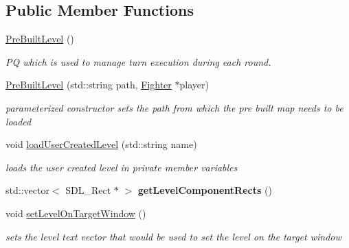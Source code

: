 \subsection*{Public Member Functions}
\begin{DoxyCompactItemize}
\item 
\hyperlink{class_pre_built_level_a86e618ddeb7a0ca8484f268dc927819d}{Pre\+Built\+Level} ()
\begin{DoxyCompactList}\small\item\em PQ which is used to manage turn execution during each round. \end{DoxyCompactList}\item 
\hypertarget{class_pre_built_level_abf37d637c8cea3dfa78adc4ee066a8be}{}\label{class_pre_built_level_abf37d637c8cea3dfa78adc4ee066a8be} 
\hyperlink{class_pre_built_level_abf37d637c8cea3dfa78adc4ee066a8be}{Pre\+Built\+Level} (std\+::string path, \hyperlink{class_fighter}{Fighter} $\ast$player)
\begin{DoxyCompactList}\small\item\em parameterized constructor sets the path from which the pre built map needs to be loaded \end{DoxyCompactList}\item 
\hypertarget{class_pre_built_level_aab6e5f41f2e67cb0c2af129dae067560}{}\label{class_pre_built_level_aab6e5f41f2e67cb0c2af129dae067560} 
void \hyperlink{class_pre_built_level_aab6e5f41f2e67cb0c2af129dae067560}{load\+User\+Created\+Level} (std\+::string name)
\begin{DoxyCompactList}\small\item\em loads the user created level in private member variables \end{DoxyCompactList}\item 
\hypertarget{class_pre_built_level_af3fec0bf964834a5330187d6b5696fee}{}\label{class_pre_built_level_af3fec0bf964834a5330187d6b5696fee} 
std\+::vector$<$ S\+D\+L\+\_\+\+Rect $\ast$ $>$ {\bfseries get\+Level\+Component\+Rects} ()
\item 
\hypertarget{class_pre_built_level_ae3464cc581f730e739cc41ea43ae8e03}{}\label{class_pre_built_level_ae3464cc581f730e739cc41ea43ae8e03} 
void \hyperlink{class_pre_built_level_ae3464cc581f730e739cc41ea43ae8e03}{set\+Level\+On\+Target\+Window} ()
\begin{DoxyCompactList}\small\item\em sets the level text vector that would be used to set the level on the target window \end{DoxyCompactList}\item 

\end{DoxyCompactItemize}

